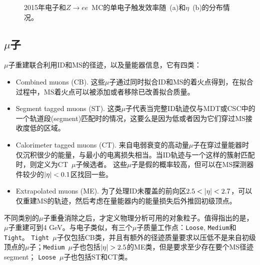 \begin{figure}[h]
\begin{center}
\begin{subfigure}[b]{0.45\textwidth}
      \caption{}
      \label{fig:ele_trigger_eta_eff}
  \end{subfigure}
\caption{2015年电子和$Z\rightarrow ee$~MC的单电子触发效率随\et~(a)和$\eta$~(b)的分布情况\cite{ATLAS-CONF-2016-024}。} 
 \label{fig:ele_trigger_eff}
\end{center}
\end{figure}

\subsection{$\mu$子}
$\mu$子重建联合利用ID和MS的径迹，以及量能器信息，它有四类：
\begin{itemize}
 \item Combined muons (CB). 这些$\mu$子通过同时拟合ID和MS的着火点得到，在拟合过程中，MS着火点可以被添加或者移除已改善拟合质量。
 \item Segment tagged muons (ST). 这类$\mu$子代表当完整ID轨迹仅与MDT或CSC中的一个轨道段(segment)匹配时的情况，这要么是因为\pt 低或者因为它们穿过MS接收度低的区域。
 \item Calorimeter tagged muons (CT). 来自电弱衰变的高动量$\mu$子在穿过量能器时仅沉积很少的能量，与最小的电离损失相当。当ID轨迹与一个这样的簇射匹配时，则定义为CT~$\mu$子候选者。 
 这些$\mu$子是假的概率较高，但可以在MS探测器件较少的$|\eta|<0.1$区找回一些。
 \item Extrapolated muons (ME). 为了处理ID未覆盖的前向区$2.5<\abseta<2.7$，可以仅重建MS的轨迹，然后考虑在量能器内的能量损失后外推回初级顶点。
\end{itemize}
不同类别的$\mu$子重叠消除之后，才定义物理分析可用的对象粒子。值得指出的是，$\mu$子重建可到4 GeV。与电子类似，有三个$\mu$子质量工作点：\texttt{Loose}, \texttt{Medium}和\texttt{Tight}。
\texttt{Tight}~$\mu$子仅包括CB类，并且有额外的径迹质量要求以压低不是来自初级顶点的$\mu$子；\texttt{Medium}~$\mu$子也包括$\abseta>2.5$的ME类，但是要求至少存在要个MS径迹segment；
\texttt{Loose}~$\mu$子也包括ST和CT类。

